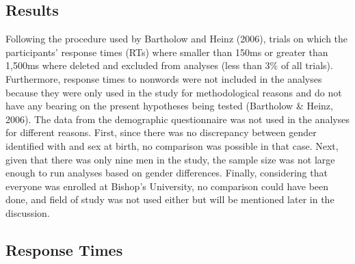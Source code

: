 \documentclass[authordate, serif, review]{jote-article}
\begin{document}
\begin{multicols}{2}
{}
\section*{Results} \gotoreview
\label{sec:results}

\noindent Following the procedure used by Bartholow and Heinz (2006), trials on which the participants' response times (RTs) where smaller than 150ms or greater than 1,500ms where deleted and excluded from analyses (less than 3\% of all trials). Furthermore, response times to nonwords were not included in the analyses because they were only used in the study for methodological reasons and do not have any bearing on the present hypotheses being tested (Bartholow \& Heinz, 2006). The data from the demographic questionnaire was not used in the analyses for different reasons. First, since there was no discrepancy between gender identified with and sex at birth, no comparison was possible in that case. Next, given that there was only nine men in the study, the sample size was not large enough to run analyses based on gender differences. Finally, considering that everyone was enrolled at Bishop's University, no comparison could have been done, and field of study was not used either but will be mentioned later in the discussion.   

{}
\subsection*{Response Times}


\end{multicols}
\end{document}
